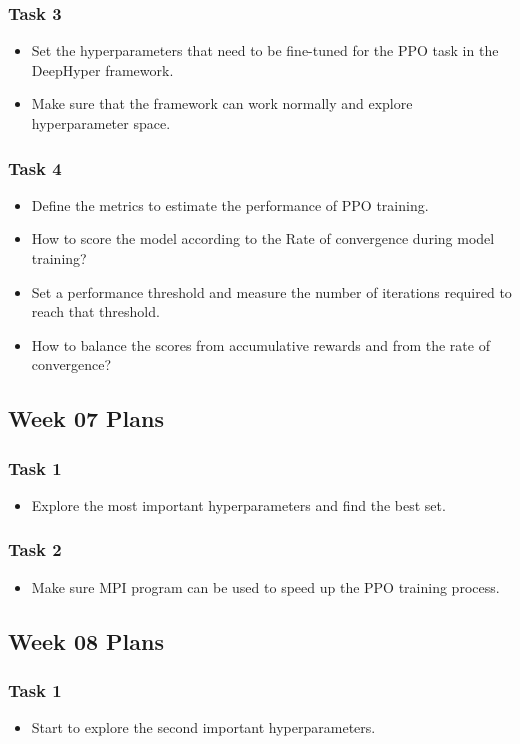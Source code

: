 \subsubsection{Task 3}
\begin{itemize}
\item Set the hyperparameters that need to be fine-tuned for the PPO task in the DeepHyper framework.
\item Make sure that the framework can work normally and explore hyperparameter space.
\end{itemize}

\subsubsection{Task 4}
\begin{itemize}
\item Define the metrics to estimate the performance of PPO training.
\item How to score the model according to the Rate of convergence during model training?
\item Set a performance threshold and measure the number of iterations required to reach that threshold.
\item How to balance the scores from accumulative rewards and from the rate of convergence?
\end{itemize}

\subsection{Week 07 Plans}

\subsubsection{Task 1}
\begin{itemize}
\item Explore the most important hyperparameters and find the best set.
\end{itemize}

\subsubsection{Task 2}
\begin{itemize}
\item Make sure MPI program can be used to speed up the PPO training process.
\end{itemize}

\subsection{Week 08 Plans}
\subsubsection{Task 1}
\begin{itemize}
\item Start to explore the second important hyperparameters.
\end{itemize}